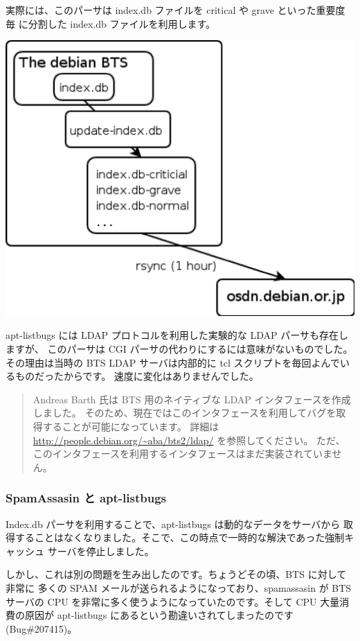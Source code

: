 \documentclass[mingoth,a4paper]{jsarticle}
\begin{document}
実際には、このパーサは index.db ファイルを critical や grave といった重要度毎
に分割した index.db ファイルを利用します。

\begin{center}
\includegraphics[scale=0.3]{image200510/indexdb.eps}
\end{center}

apt-listbugs には LDAP プロトコルを利用した実験的な LDAP パーサも存在しますが、
このパーサは CGI パーサの代わりにするには意味がないものでした。その理由は当時の
BTS LDAP サーバは内部的に tcl スクリプトを毎回よんでいるものだったからです。
速度に変化はありませんでした。

\begin{quote}
Andreas Barth 氏は BTS 用のネイティブな LDAP インタフェースを作成しました。
そのため、現在ではこのインタフェースを利用してバグを取得することが可能になっています。
詳細は \url{http://people.debian.org/~aba/bts2/ldap/} を参照してください。
ただ、このインタフェースを利用するインタフェースはまだ実装されていません。
\end{quote}

\subsubsection{SpamAssasin と apt-listbugs}

Index.db パーサを利用することで、apt-listbugs は動的なデータをサーバから
取得することはなくなりました。そこで、この時点で一時的な解決であった強制キャッシュ
サーバを停止しました。

しかし、これは別の問題を生み出したのです。ちょうどその頃、BTS に対して非常に
多くの SPAM メールが送られるようになっており、spamassasin が BTS サーバの
CPU を非常に多く使うようになっていたのです。そして CPU 大量消費の原因が
apt-listbugs にあるという勘違いされてしまったのです(Bug\#207415)。
\end{document}

